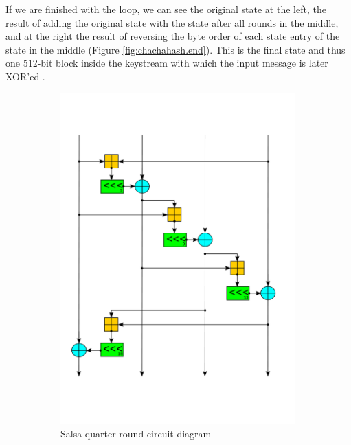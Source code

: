 If we are finished with the loop, we can see the original state at the left, the result of adding the original state with the state after all rounds in the middle, and at the right the result of reversing the byte order of each state entry of the state in the middle (Figure \ref{fig:chachahash.end}). This is the final state and thus one 512-bit block inside the keystream with which the input message is later XOR'ed .

\begin{figure}
\centering
\begin{subfigure}[t]{0.5\textwidth}
  \centering
  \includegraphics[width=0.99\textwidth]{figures/wiki-qr-circuit/salsa-wiki-qr-circuit.png}
  \caption{Salsa quarter-round circuit diagram}
  \label{fig:wiki.qr.circuit.salsa}
\end{subfigure}%
\begin{subfigure}[t]{0.5\textwidth}
  \centering

\end{subfigure}
\end{figure}
